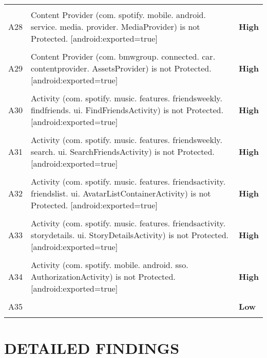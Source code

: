 \documentclass[12p]{article}
\begin{document}
\begin{longtable}{p{0.5cm} p{10cm} p{1.5cm}}
\hline\\	A28&Content Provider \newline (com. spotify. mobile. android. service. media. provider. MediaProvider) is not Protected. [android:exported=true]& \color{ferrarired}\textbf{High} \\
\hline\\	A29&Content Provider \newline (com. bmwgroup. connected. car. contentprovider. AssetsProvider) is not Protected. [android:exported=true]& \color{ferrarired}\textbf{High} \\
\hline\\	A30&Activity \newline (com. spotify. music. features. friendsweekly. findfriends. ui. FindFriendsActivity) is not Protected. [android:exported=true]& \color{ferrarired}\textbf{High} \\
\hline\\	A31&Activity \newline (com. spotify. music. features. friendsweekly. search. ui. SearchFriendsActivity) is not Protected. [android:exported=true]& \color{ferrarired}\textbf{High} \\
\hline\\	A32&Activity \newline (com. spotify. music. features. friendsactivity. friendslist. ui. AvatarListContainerActivity) is not Protected. [android:exported=true]& \color{ferrarired}\textbf{High} \\
\hline\\	A33&Activity \newline (com. spotify. music. features. friendsactivity. storydetails. ui. StoryDetailsActivity) is not Protected. [android:exported=true]& \color{ferrarired}\textbf{High} \\
\hline\\	A34&Activity \newline (com. spotify. mobile. android. sso. AuthorizationActivity) is not Protected. [android:exported=true]& \color{ferrarired}\textbf{High} \\
\hline\\	A35&& \color{amber}\textbf{Low} \\
\hline\\	\end{longtable}
\cleardoublepage
\newpage
\section{DETAILED FINDINGS}
\end{document}

